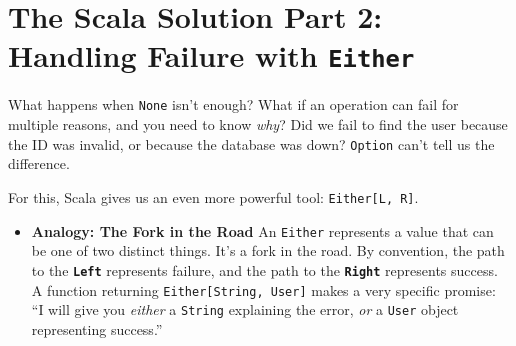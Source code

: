 \documentclass[
  letterpaper,
  DIV=11,
  numbers=noendperiod]{scrreprt}
\newenvironment{Shaded}{\begin{snugshade}}{\end{snugshade}}
\newcommand{\CommentTok}[1]{\textcolor[rgb]{0.37,0.37,0.37}{#1}}
\newcommand{\DecValTok}[1]{\textcolor[rgb]{0.68,0.00,0.00}{#1}}
\newcommand{\FunctionTok}[1]{\textcolor[rgb]{0.28,0.35,0.67}{#1}}
\newcommand{\KeywordTok}[1]{\textcolor[rgb]{0.00,0.23,0.31}{\textbf{#1}}}
\newcommand{\NormalTok}[1]{\textcolor[rgb]{0.00,0.23,0.31}{#1}}
\newcommand{\OperatorTok}[1]{\textcolor[rgb]{0.37,0.37,0.37}{#1}}
\newcommand{\SpecialStringTok}[1]{\textcolor[rgb]{0.13,0.47,0.30}{#1}}
\newcommand{\StringTok}[1]{\textcolor[rgb]{0.13,0.47,0.30}{#1}}
\providecommand{\tightlist}{%
  \setlength{\itemsep}{0pt}\setlength{\parskip}{0pt}}
\begin{document}
\begin{Shaded}
\end{Shaded}

\section{\texorpdfstring{The Scala Solution Part 2: Handling Failure
with
\texttt{Either}}{The Scala Solution Part 2: Handling Failure with Either}}\label{the-scala-solution-part-2-handling-failure-with-either}

What happens when \texttt{None} isn't enough? What if an operation can
fail for multiple reasons, and you need to know \emph{why}? Did we fail
to find the user because the ID was invalid, or because the database was
down? \texttt{Option} can't tell us the difference.

For this, Scala gives us an even more powerful tool:
\texttt{Either{[}L,\ R{]}}.

\begin{itemize}
\tightlist
\item
  \textbf{Analogy: The Fork in the Road} An \texttt{Either} represents a
  value that can be one of two distinct things. It's a fork in the road.
  By convention, the path to the \textbf{\texttt{Left}} represents
  failure, and the path to the \textbf{\texttt{Right}} represents
  success. A function returning \texttt{Either{[}String,\ User{]}} makes
  a very specific promise: ``I will give you \emph{either} a
  \texttt{String} explaining the error, \emph{or} a \texttt{User} object
  representing success.''
\end{itemize}
\end{document}
